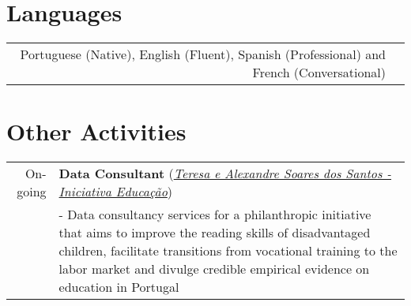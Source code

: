 \documentclass[a4paper,11pt]{article} %
\begin{document}

\section[Languages]{\faLanguage \hspace{3pt} Languages}

\begin{tabular}{rp{13cm}}
	Portuguese (Native), English (Fluent), Spanish (Professional) and French (Conversational)

\end{tabular}

%
%



\section[Other Activities]{\faCubes \hspace{3pt} Other Activities}

\begin{tabular}{r|p{13cm}}
	On-going & \textbf{Data Consultant} (\textit{\href{https://www.iniciativaeducacao.org/en}{Teresa e Alexandre Soares dos Santos - Iniciativa Educação}}) \\
	& - Data consultancy services for a philanthropic initiative that aims to improve the reading skills of disadvantaged children, facilitate transitions from vocational training to the labor market and divulge credible empirical evidence on education in Portugal
\end{tabular}
\end{document}
